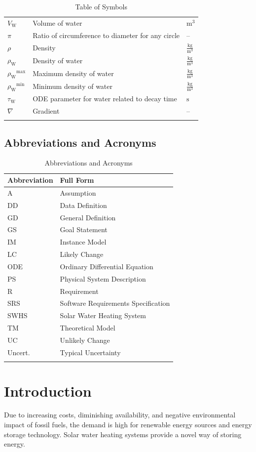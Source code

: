 \documentclass[12pt]{article}
\begin{document}
\begin{longtabu}{l X[l] l}
\\
${V_{\text{W}}}$ & Volume of water & ${\text{m}^{3}}$
\\
$π$ & Ratio of circumference to diameter for any circle & --
\\
$ρ$ & Density & $\frac{\text{kg}}{\text{m}^{3}}$
\\
${ρ_{\text{W}}}$ & Density of water & $\frac{\text{kg}}{\text{m}^{3}}$
\\
${{ρ_{\text{W}}}^{\text{max}}}$ & Maximum density of water & $\frac{\text{kg}}{\text{m}^{3}}$
\\
${{ρ_{\text{W}}}^{\text{min}}}$ & Minimum density of water & $\frac{\text{kg}}{\text{m}^{3}}$
\\
${τ_{\text{W}}}$ & ODE parameter for water related to decay time & ${\text{s}}$
\\
$∇$ & Gradient & --
\\
\bottomrule
\caption{Table of Symbols}
\label{Table:ToS}
\end{longtabu}
\subsection{Abbreviations and Acronyms}
\label{Sec:TAbbAcc}
\begin{longtable}{l l}
\toprule
\textbf{Abbreviation} & \textbf{Full Form}
\\
\midrule
\endhead
A & Assumption
\\
DD & Data Definition
\\
GD & General Definition
\\
GS & Goal Statement
\\
IM & Instance Model
\\
LC & Likely Change
\\
ODE & Ordinary Differential Equation
\\
PS & Physical System Description
\\
R & Requirement
\\
SRS & Software Requirements Specification
\\
SWHS & Solar Water Heating System
\\
TM & Theoretical Model
\\
UC & Unlikely Change
\\
Uncert. & Typical Uncertainty
\\
\bottomrule
\caption{Abbreviations and Acronyms}
\label{Table:TAbbAcc}
\end{longtable}
\section{Introduction}
\label{Sec:Intro}
Due to increasing costs, diminishing availability, and negative environmental impact of fossil fuels, the demand is high for renewable energy sources and energy storage technology. Solar water heating systems provide a novel way of storing energy.
\end{document}
